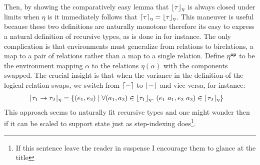 Then, by showing the comparatively easy lemma that
$\lfloor \tau \rfloor_\eta$ is always closed under limits when $\eta$ is it
immediately follows that
$\lceil \tau \rceil_\eta = \lfloor \tau \rfloor_\eta$. This maneuver is
useful because these two definitions are naturally monotone therefore
its easy to express a natural definition of recursive types, as is
done in \citet{Crary:07} for instance. The only complication
is that environments must generalize from relations to birelations, a
map to a pair of relations rather than a map to a single
relation. Define $\eta^{\mathsf{op}}$ to be the environment mapping $\alpha$ to
the relations $\eta(\alpha)$ with the components swapped. The crucial
insight is that when the variance in the definition of the logical
relation swaps, we switch from $\lceil - \rceil$ to $\lfloor - \rfloor$ and
vice-versa, for instance:
\begin{align*}
  \lceil \tau_1 \to \tau_2 \rceil_\eta &=
  \{(e_1, e_2) \mid \forall (a_1, a_2) \in \lfloor \tau_1 \rfloor_\eta.
  \ (e_1\ a_1, e_2\ a_2) \in \lceil \tau_2 \rceil_\eta\}
\end{align*}
This approach seems to naturally fit recursive types and one might
wonder then if it can be scaled to support state just as step-indexing
does\footnote{If this sentence leave the reader in suspense I
  encourage them to glance at the title}.


